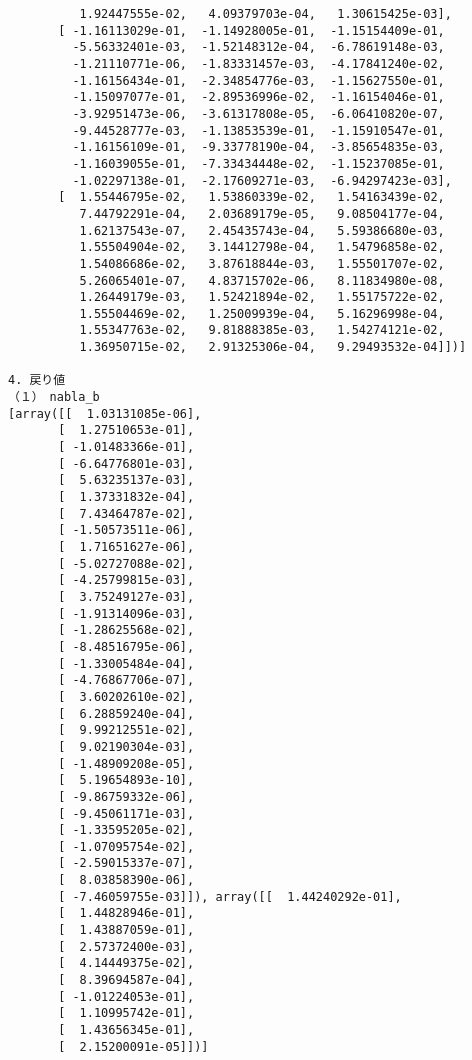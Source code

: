 \documentclass[11pt,a4j,fleqn]{jarticle}
\begin{document}
\begin{verbatim}
          1.92447555e-02,   4.09379703e-04,   1.30615425e-03],
       [ -1.16113029e-01,  -1.14928005e-01,  -1.15154409e-01,
         -5.56332401e-03,  -1.52148312e-04,  -6.78619148e-03,
         -1.21110771e-06,  -1.83331457e-03,  -4.17841240e-02,
         -1.16156434e-01,  -2.34854776e-03,  -1.15627550e-01,
         -1.15097077e-01,  -2.89536996e-02,  -1.16154046e-01,
         -3.92951473e-06,  -3.61317808e-05,  -6.06410820e-07,
         -9.44528777e-03,  -1.13853539e-01,  -1.15910547e-01,
         -1.16156109e-01,  -9.33778190e-04,  -3.85654835e-03,
         -1.16039055e-01,  -7.33434448e-02,  -1.15237085e-01,
         -1.02297138e-01,  -2.17609271e-03,  -6.94297423e-03],
       [  1.55446795e-02,   1.53860339e-02,   1.54163439e-02,
          7.44792291e-04,   2.03689179e-05,   9.08504177e-04,
          1.62137543e-07,   2.45435743e-04,   5.59386680e-03,
          1.55504904e-02,   3.14412798e-04,   1.54796858e-02,
          1.54086686e-02,   3.87618844e-03,   1.55501707e-02,
          5.26065401e-07,   4.83715702e-06,   8.11834980e-08,
          1.26449179e-03,   1.52421894e-02,   1.55175722e-02,
          1.55504469e-02,   1.25009939e-04,   5.16296998e-04,
          1.55347763e-02,   9.81888385e-03,   1.54274121e-02,
          1.36950715e-02,   2.91325306e-04,   9.29493532e-04]])]

4. 戻り値
（１）　nabla_b
[array([[  1.03131085e-06],
       [  1.27510653e-01],
       [ -1.01483366e-01],
       [ -6.64776801e-03],
       [  5.63235137e-03],
       [  1.37331832e-04],
       [  7.43464787e-02],
       [ -1.50573511e-06],
       [  1.71651627e-06],
       [ -5.02727088e-02],
       [ -4.25799815e-03],
       [  3.75249127e-03],
       [ -1.91314096e-03],
       [ -1.28625568e-02],
       [ -8.48516795e-06],
       [ -1.33005484e-04],
       [ -4.76867706e-07],
       [  3.60202610e-02],
       [  6.28859240e-04],
       [  9.99212551e-02],
       [  9.02190304e-03],
       [ -1.48909208e-05],
       [  5.19654893e-10],
       [ -9.86759332e-06],
       [ -9.45061171e-03],
       [ -1.33595205e-02],
       [ -1.07095754e-02],
       [ -2.59015337e-07],
       [  8.03858390e-06],
       [ -7.46059755e-03]]), array([[  1.44240292e-01],
       [  1.44828946e-01],
       [  1.43887059e-01],
       [  2.57372400e-03],
       [  4.14449375e-02],
       [  8.39694587e-04],
       [ -1.01224053e-01],
       [  1.10995742e-01],
       [  1.43656345e-01],
       [  2.15200091e-05]])]


\end{verbatim}
\end{document}
